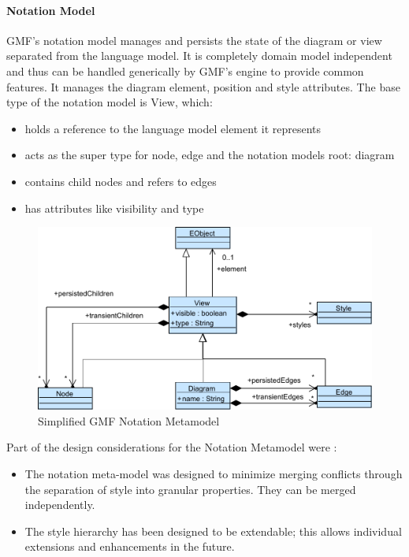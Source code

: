 \paragraph{Notation Model}
GMF's notation model manages and persists the state of the diagram or view separated from the language model. It is completely domain model independent and thus can be handled generically by GMF's engine to provide common features. It manages the diagram element, position and style attributes. \cite{EMP} The base type of the notation model is View, which:
\begin{itemize}
	\item holds a reference to the language model element it represents 
	\item acts as the super type for node, edge and the notation models root: diagram
	\item contains child nodes and refers to edges
	\item has attributes like visibility and type
\end{itemize}

\begin{figure}
\centering
\includegraphics[scale=0.8]{gfx/ex/GMF_Notation} 
\caption{Simplified GMF Notation Metamodel}
\label{MM:GMF}
\end{figure}

Part of the design considerations for the Notation Metamodel were \cite{GMFDoc}:
\begin{itemize}
	\item The notation meta-model was designed to minimize merging conflicts through the separation of style into granular properties. They can be merged independently.
	\item The style hierarchy has been designed to be extendable; this allows individual extensions and enhancements in the future. 
\end{itemize}

